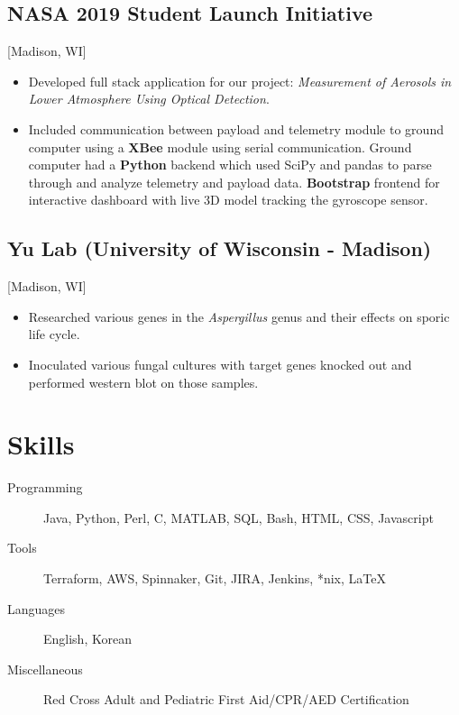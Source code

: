 \documentclass{mycv}
\begin{document}
\subsection{NASA 2019 Student Launch Initiative}[Madison, WI]
\begin{positions}
\end{positions}
\begin{itemize}
  \item Developed full stack application for our project: \textit{Measurement of Aerosols in Lower Atmosphere Using Optical Detection}.  
  \item {
  Included communication between payload and telemetry module to ground computer using a \textbf{XBee} module using serial communication. Ground computer had a \textbf{Python} backend which used SciPy and pandas to parse through and analyze telemetry and payload data. \textbf{Bootstrap} frontend for interactive dashboard with live 3D model tracking the gyroscope sensor.
  }
\end{itemize}


\subsection{Yu Lab (University of Wisconsin - Madison)}[Madison, WI]
\begin{positions}
\end{positions}
\begin{itemize}
  \item{
  Researched various genes in the \textit{Aspergillus} genus and their effects on sporic life cycle. 
  }
  \item{
  Inoculated various fungal cultures with target genes knocked out and performed western blot on those samples. 
  }
\end{itemize}

\section{Skills}
\begin{description}
  \item[Programming] Java, Python, Perl, C, MATLAB, SQL, Bash, HTML, CSS, Javascript
  \item[Tools] Terraform, AWS, Spinnaker, Git, JIRA, Jenkins, *nix, \LaTeX 
  \item[Languages] English, Korean
  \item[Miscellaneous] Red Cross Adult and Pediatric First Aid/CPR/AED Certification
\end{description}
\end{document}
